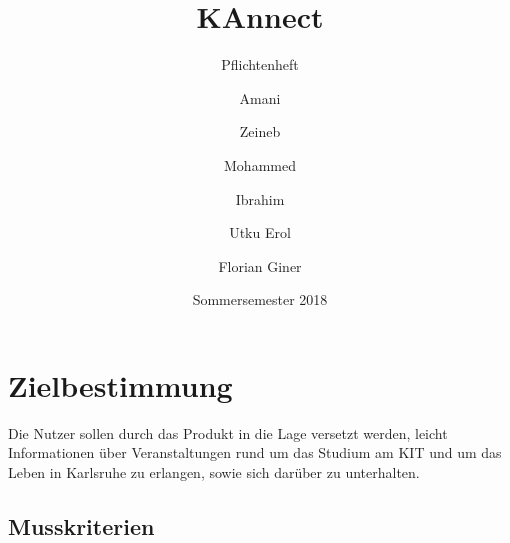 \documentclass[parskip=full]{scrartcl}
\title{KAnnect}
\subtitle{Pflichtenheft}
\author{
Amani
\and Zeineb
\and Mohammed
\and Ibrahim
\and Utku Erol
\and Florian Giner
}
\date{Sommersemester 2018}
\begin{document}
	\maketitle
	\newpage
	\tableofcontents
	\newpage
	\setlength{\parindent}{0em}
	\setlength{\parskip}{0.5em}

	\section{Zielbestimmung}
	Die Nutzer sollen durch das Produkt in die Lage versetzt werden, leicht Informationen über Veranstaltungen rund um das Studium am
	KIT und um das Leben in Karlsruhe zu erlangen, sowie sich darüber zu unterhalten.

	\subsection{Musskriterien}
\end{document}
